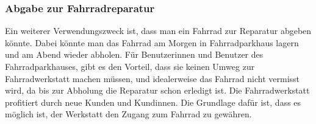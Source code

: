 \subsubsection{Abgabe zur Fahrradreparatur}
Ein weiterer Verwendungszweck ist, dass man ein Fahrrad zur Reparatur abgeben könnte. Dabei könnte man das Fahrrad am Morgen in Fahrradparkhaus lagern und am Abend wieder abholen. Für Benutzerinnen und Benutzer des Fahrradparkhauses, gibt es den Vorteil, dass sie keinen Umweg zur Fahrradwerkstatt machen müssen, und idealerweise das Fahrrad nicht vermisst wird, da bis zur Abholung die Reparatur schon erledigt ist. Die Fahrradwerkstatt profitiert durch neue Kunden und Kundinnen. Die Grundlage dafür ist, dass es möglich ist, der Werkstatt den Zugang zum Fahrrad zu gewähren.\\